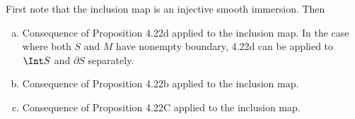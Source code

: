 First note that the inclusion map is an injective smooth immersion.  Then

\begin{enumerate}[a)]
\item Consequence of Proposition 4.22d applied to the inclusion map.  In the case where both $S$ and $M$ have nonempty boundary, 4.22d can be applied to $\Int S$ and $\partial S$ separately.
\item Consequence of Proposition 4.22b applied to the inclusion map.
\item Consequence of Proposition 4.22C applied to the inclusion map.
\end{enumerate}
